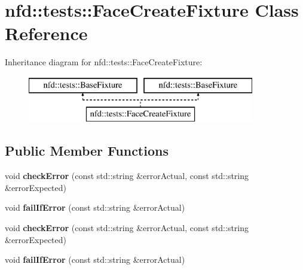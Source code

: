 \hypertarget{classnfd_1_1tests_1_1FaceCreateFixture}{}\section{nfd\+:\+:tests\+:\+:Face\+Create\+Fixture Class Reference}
\label{classnfd_1_1tests_1_1FaceCreateFixture}
Inheritance diagram for nfd\+:\+:tests\+:\+:Face\+Create\+Fixture\+:\begin{figure}[H]
\begin{center}
\leavevmode
\includegraphics[height=2.000000cm]{classnfd_1_1tests_1_1FaceCreateFixture}
\end{center}
\end{figure}
\subsection*{Public Member Functions}
\begin{DoxyCompactItemize}
\item 
void {\bfseries check\+Error} (const std\+::string \&error\+Actual, const std\+::string \&error\+Expected)\hypertarget{classnfd_1_1tests_1_1FaceCreateFixture_a9a21d6648d3c65e81e57909a2aec628a}{}\label{classnfd_1_1tests_1_1FaceCreateFixture_a9a21d6648d3c65e81e57909a2aec628a}

\item 
void {\bfseries fail\+If\+Error} (const std\+::string \&error\+Actual)\hypertarget{classnfd_1_1tests_1_1FaceCreateFixture_a973c508de45175d6511d1e06d0b8ba87}{}\label{classnfd_1_1tests_1_1FaceCreateFixture_a973c508de45175d6511d1e06d0b8ba87}

\item 
void {\bfseries check\+Error} (const std\+::string \&error\+Actual, const std\+::string \&error\+Expected)\hypertarget{classnfd_1_1tests_1_1FaceCreateFixture_a9a21d6648d3c65e81e57909a2aec628a}{}\label{classnfd_1_1tests_1_1FaceCreateFixture_a9a21d6648d3c65e81e57909a2aec628a}

\item 
void {\bfseries fail\+If\+Error} (const std\+::string \&error\+Actual)\hypertarget{classnfd_1_1tests_1_1FaceCreateFixture_a973c508de45175d6511d1e06d0b8ba87}{}\label{classnfd_1_1tests_1_1FaceCreateFixture_a973c508de45175d6511d1e06d0b8ba87}

\end{DoxyCompactItemize}
